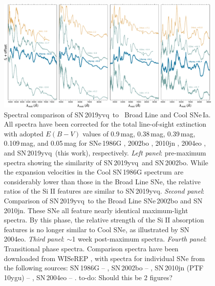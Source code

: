 \documentclass[twocolumn]{aastex63}
\def\ion#1#2{#1$\;${\footnotesize\rm{#2}}\relax}
\newcommand{\todo}[1]{{\color{magenta} to-do: {#1}}}
\newcommand{\sn}{SN\,2019yvq}
\begin{document}

\begin{figure}
    \centering
    \includegraphics[width=7.25in]{./figures/spec_comp_extinction.pdf}
    \caption{Spectral comparison of \sn\ to \citeauthor{Branch06}~Broad Line
    and Cool SNe\,Ia. All spectra have been corrected for the total
    line-of-sight extinction with adopted $E(B-V)$ values of 0.9\,mag,
    0.38\,mag, 0.39\,mag, 0.109\,mag, and 0.05\,mag for SNe\,1986G
    \citep{Phillips87}, 2002bo \citep{Stehle05}, 2010jn \citep{Hachinger13},
    2004eo \citep{Pastorello07}, and \sn\ (this work), respectively.
    \textit{Left panel}: pre-maximum spectra showing the similarity of \sn\
    and SN\,2002bo. While the expansion velocities in the Cool SN\,1986G
    spectrum are considerably lower than those in the Broad Line SNe, the
    relative ratios of the \ion{Si}{II} features are similar to \sn.
    \textit{Second panel}: Comparison of \sn\ to the Broad Line SNe\,2002bo
    and SN\,2010jn. These SNe all feature nearly identical maximum-light
    spectra. By this phase, the relative strength of the \ion{Si}{II}
    absorption features is no longer similar to \citet{Branch06} Cool SNe, as
    illustrated by SN\,2004eo. \textit{Third panel}: $\sim$1 week post-maximum
    spectra. \textit{Fourth panel}: Transitional phase spectra. Comparison
    spectra have been downloaded from WISeREP \citep{Yaron12}, with spectra
    for individual SNe from the following sources: SN\,1986G --
    \citet{Cristiani92}, SN\,2002bo -- \citet{Benetti04,Silverman11},
    SN\,2010jn (PTF\,10ygu) -- \citet{Hachinger13,Maguire14}, SN\,2004eo --
    \citet{Pastorello07}. \todo{Should this be 2 figures?}}
    \label{fig:spec_comp}
\end{figure}
\end{document}
